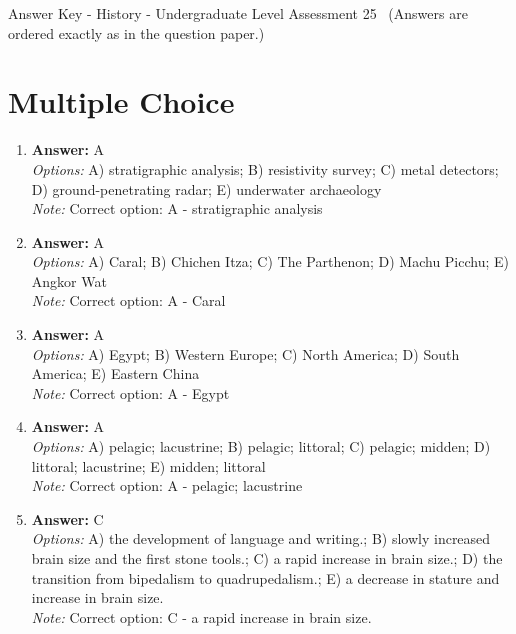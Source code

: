 \documentclass[12pt]{article}
\begin{document}
\begin{center}
Answer Key - History - Undergraduate Level Assessment 25 \
\small (Answers are ordered exactly as in the question paper.)
\end{center}

\section*{Multiple Choice}
\begin{enumerate}[label=\arabic*.]
\item \textbf{Answer:} A
\\ \textit{Options:} A) stratigraphic analysis; B) resistivity survey; C) metal detectors; D) ground-penetrating radar; E) underwater archaeology
\\ \textit{Note:} Correct option: A - stratigraphic analysis
\item \textbf{Answer:} A
\\ \textit{Options:} A) Caral; B) Chichen Itza; C) The Parthenon; D) Machu Picchu; E) Angkor Wat
\\ \textit{Note:} Correct option: A - Caral
\item \textbf{Answer:} A
\\ \textit{Options:} A) Egypt; B) Western Europe; C) North America; D) South America; E) Eastern China
\\ \textit{Note:} Correct option: A - Egypt
\item \textbf{Answer:} A
\\ \textit{Options:} A) pelagic; lacustrine; B) pelagic; littoral; C) pelagic; midden; D) littoral; lacustrine; E) midden; littoral
\\ \textit{Note:} Correct option: A - pelagic; lacustrine
\item \textbf{Answer:} C
\\ \textit{Options:} A) the development of language and writing.; B) slowly increased brain size and the first stone tools.; C) a rapid increase in brain size.; D) the transition from bipedalism to quadrupedalism.; E) a decrease in stature and increase in brain size.
\\ \textit{Note:} Correct option: C - a rapid increase in brain size.
\end{enumerate}
\end{document}
